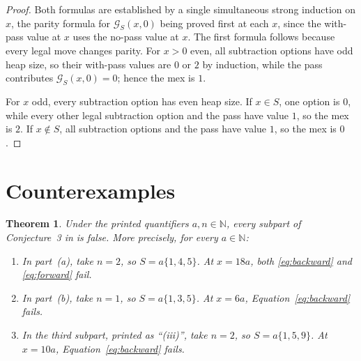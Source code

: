 \documentclass[11pt]{amsart}
\newtheorem{theorem}{Theorem}
\theoremstyle{remark}
\newcommand{\G}{\mathcal{G}}
\begin{document}
\begin{proof}
Both formulas are established by a single simultaneous strong
induction on $x$, the parity formula for $\G_S(x,0)$ being proved
first at each $x$, since the with-pass value at $x$ uses the no-pass
value at $x$. The first formula follows because every legal move
changes parity. For $x>0$ even, all subtraction options have odd heap
size, so their with-pass values are $0$ or $2$ by induction, while
the pass contributes $\G_S(x,0)=0$; hence the mex is $1$.

For $x$ odd, every subtraction option has even heap size. If $x\in S$,
one option is $0$, while every other legal subtraction option and the
pass have value $1$, so the mex is $2$. If $x\notin S$, all subtraction
options and the pass have value $1$, so the mex is $0$.
\end{proof}

\section{Counterexamples}

\begin{theorem}\label{thm:main}
Under the printed quantifiers $a,n\in\mathbb N$, every subpart of
Conjecture~3 in \cite{LMM} is false. More precisely, for every
$a\in\mathbb N$:
\begin{enumerate}
\item
In part~(a), take $n=2$, so $S=a\{1,4,5\}$. At $x=18a$, both
\eqref{eq:backward} and \eqref{eq:forward} fail.

\item
In part~(b), take $n=1$, so $S=a\{1,3,5\}$. At $x=6a$,
Equation~\eqref{eq:backward} fails.

\item
In the third subpart, printed as ``(iii)'', take $n=2$, so
$S=a\{1,5,9\}$. At $x=10a$, Equation~\eqref{eq:backward} fails.
\end{enumerate}
\end{theorem}
\end{document}
